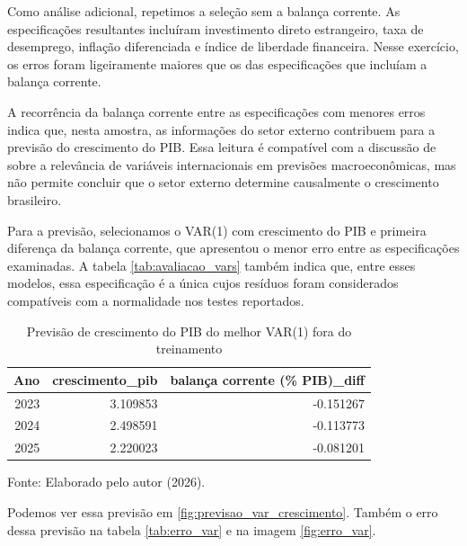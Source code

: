 Como análise adicional, repetimos a seleção sem a balança corrente. As especificações resultantes incluíram investimento direto estrangeiro, taxa de desemprego, inflação diferenciada e índice de liberdade financeira. Nesse exercício, os erros foram ligeiramente maiores que os das especificações que incluíam a balança corrente.

A recorrência da balança corrente entre as especificações com menores erros indica que, nesta amostra, as informações do setor externo contribuem para a previsão do crescimento do PIB. Essa leitura é compatível com a discussão de  sobre a relevância de variáveis internacionais em previsões macroeconômicas, mas não permite concluir que o setor externo determine causalmente o crescimento brasileiro.

Para a previsão, selecionamos o VAR(1) com crescimento do PIB e primeira diferença da balança corrente, que apresentou o menor erro entre as especificações examinadas. A tabela \ref{tab:avaliacao_vars} também indica que, entre esses modelos, essa especificação é a única cujos resíduos foram considerados compatíveis com a normalidade nos testes reportados.


\begin{table}[htbp]
	\centering
	\captionsetup{justification=centering}
	\caption{Previsão de crescimento do PIB do melhor VAR(1) fora do treinamento}
	\label{tab:previsao_cresc_var}
	
	\scriptsize
	\setlength{\tabcolsep}{2pt}
	\renewcommand{\arraystretch}{1.3}
	
	\begin{tabular}{rrr}
		\toprule
		Ano & crescimento\_pib & balança corrente (\% PIB)\_diff \\
		\midrule
		2023 & 3.109853 & -0.151267 \\
		2024 & 2.498591 & -0.113773 \\
		2025 & 2.220023 & -0.081201 \\
		\bottomrule
	\end{tabular}
	
	
	\vspace{0.1cm}
	
	\small Fonte: Elaborado pelo autor (2026).
\end{table}


Podemos ver essa previsão em \ref{fig:previsao_var_crescimento}. Também o erro dessa previsão na tabela \ref{tab:erro_var} e na imagem \ref{fig:erro_var}.

